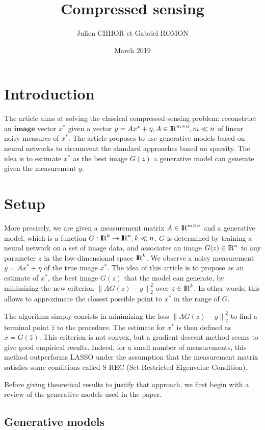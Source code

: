 \documentclass{article}
\title{Compressed sensing}
\author{Julien CHHOR et Gabriel ROMON}
\date{March 2019}
\newcommand\norm[1]{\left\lVert#1\right\rVert}
\def\R{\textrm{I\kern-0.21emR}}
\theoremstyle{definition}
\theoremstyle{lemma}
\theoremstyle{theorem}
\begin{document}
\maketitle

\section{Introduction}
The article aims at solving the classical compressed sensing problem: reconstruct an $\textbf{image}$ vector $x^*$ given a vector $y = Ax^* + \eta,  A \in \R^{m \times n}, m \ll n$ of linear noisy measures of $x^*$. The article proposes to use generative models based on neural networks to circumvent the standard approaches based on sparsity. The idea is to estimate $x^*$ as the best image $G(z)$ a generative model can generate given the measurement $y$. 

\section{Setup}
More precisely, we are given a measurement matrix $A \in \R^{m \times n}$ and a generative model, which is a function $G : \R^k \rightarrow \R^n, k \ll n$. $G$ is determined by training a neural network on a set of image data, and associates an image $G(z) \in \R^n$ to any parameter $z$ in the low-dimensional space $\R^k$. We observe a noisy measurement $y = Ax^* + \eta$ of the true image $x^*$. The idea of this article is to propose as an estimate of $x^*$, the best image $G(z)$ that the model can generate, by minimizing the new criterion $\norm{AG(z) - y}_2^2$ over $z \in \R^k$. In other words, this allows to approximate the closest possible point to $x^*$ in the range of $G$.

The algorithm simply consists in minimizing the loss $\norm{AG(z) - y}_2^2$ to find a terminal point $\hat{z}$ to the procedure. The estimate for $x^*$ is then defined as $\hat{x} = G(\hat{z})$. This criterion is not convex, but a gradient descent method seems to give good empirical results. Indeed, for a small number of measurements, this method outperforms LASSO under the assumption that the measurement matrix satisfies some conditions called S-REC (Set-Restricted Eigenvalue Condition).


Before giving theoretical results to justify that approach, we first begin with a review of the generative models used in the paper.

\subsection{Generative models}
\end{document}
